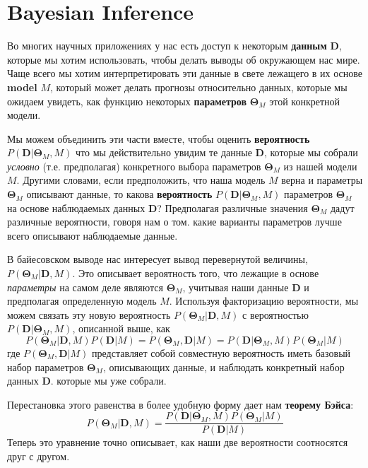 \documentclass[12pt, titlepage]{article}
\newcommand{\params}{\ensuremath{\boldsymbol\Theta}}
\newcommand{\data}{\ensuremath{\mathbf{D}}}
\begin{document}
\section{Bayesian Inference} \label{sec:bayes}

Во многих научных приложениях у нас есть доступ к некоторым \textbf{данным} $\data$, которые мы хотим использовать, чтобы делать выводы об окружающем нас мире. Чаще всего мы хотим интерпретировать эти данные в свете лежащего в их основе \textbf{model} $M$, который может делать прогнозы относительно данных, которые мы ожидаем увидеть, как функцию некоторых \textbf{параметров} $\params_M$ этой конкретной модели.

Мы можем объединить эти части вместе, чтобы оценить \textbf{вероятность} $P(\data|\params_M, M)$ что мы действительно увидим те данные $\data$, которые мы собрали \textit{условно} (т.е. предполагая) конкретного выбора параметров $\params_M$ из нашей модели $M$. Другими словами, если предположить, что наша модель $M$ верна и параметры $\params_M$ описывают данные, то какова \textbf{вероятность} $P(\data|\params_M, M)$ параметров $\params_M$ на основе наблюдаемых данных $\data$? Предполагая различные значения $\params_M$ дадут различные вероятности, говоря нам о том. какие варианты параметров лучше всего описывают наблюдаемые данные.

В байесовском выводе нас интересует вывод перевернутой величины, $P(\params_M|\data, M)$. Это описывает вероятность того, что лежащие в основе \textit{параметры} на самом деле являются $\params_M$, учитывая наши данные $\data$ и предполагая определенную модель $M$. Используя факторизацию вероятности, мы можем связать эту новую вероятность $P(\params_M|\data, M)$ с вероятностью $P(\data|\params_M, M)$, описанной выше, как
\begin{equation}
    P(\params_M | \data, M) P(\data | M) 
    = P(\params_M, \data | M)
    = P(\data | \params_M, M) P(\params_M | M)
\end{equation}
где $P(\params_M, \data | M)$ представляет собой совместную вероятность иметь базовый набор параметров $\params_M$, описывающих данные, и наблюдать конкретный набор данных $\data$. которые мы уже собрали.

Перестановка этого равенства в более удобную форму дает нам \textbf{теорему Бэйса}:
\begin{equation}
    P(\params_M | \data, M) 
    = \frac{P(\data | \params_M, M) P(\params_M | M)}{P(\data | M)}
\end{equation}
Теперь это уравнение точно описывает, как наши две вероятности соотносятся друг с другом.
\end{document}
